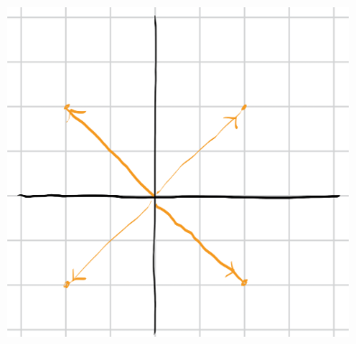 \documentclass[10pt]{mypackage}
\begin{document}
\begin{enumerate}[(a)]
\begin{center}
      \includegraphics[width=10cm]{images/3_5_23d.png}
    \end{center}
\end{enumerate}
%
\end{document}
